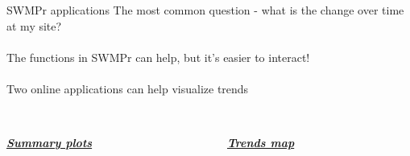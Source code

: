 \documentclass[serif]{beamer}\usepackage[]{graphicx}\usepackage[]{color}
\newcommand{\Bigtxt}[1]{\textbf{\textit{#1}}}
\begin{document}
\begin{frame}[fragile]{SWMPr applications}
The most common question - what is the change over time at my site? \\~\\
The functions in SWMPr can help, but it's easier to interact!\\~\\
Two online applications can help visualize trends \\~\\
\begin{columns}[t]
\begin{column}{0.45\textwidth}
\centerline{\Bigtxt{\href{https://beckmw.shinyapps.io/swmp_summary}{Summary plots}}}
\centerline{}
\end{column}
\begin{column}{0.45\textwidth}
\centerline{\Bigtxt{\href{https://beckmw.shinyapps.io/swmp_comp}{Trends map}}}
\centerline{}
\end{column}
\end{columns}
\end{frame}
\end{document}
